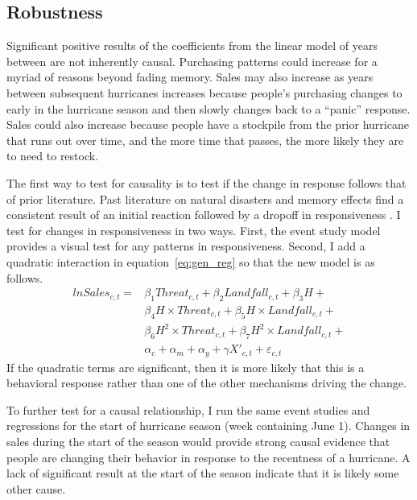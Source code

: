 \documentclass{article}
\begin{document}
\subsection{Robustness}

Significant positive results of the coefficients from the linear model of years between are not inherently causal. Purchasing patterns could increase for a myriad of reasons beyond fading memory. Sales may also increase as years between subsequent hurricanes increases because people's purchasing changes to early in the hurricane season and then slowly changes back to a ``panic'' response. Sales could also increase because people have a stockpile from the prior hurricane that runs out over time, and the more time that passes, the more likely they are to need to restock. 

The first way to test for causality is to test if the change in response follows that of prior literature. Past literature on natural disasters and memory effects find a consistent result of an initial reaction followed by a dropoff in responsiveness \citep{gallagher2014learning,kelly2012evolution,MeyerEtAl14}. I test for changes in responsiveness in two ways. First, the event study model provides a visual test for any patterns in responsiveness. Second, I add a quadratic interaction in equation~\ref{eq:gen_reg} so that the new model is as follows.  
\begin{equation}
\begin{split}
lnSales_{c,t} = &\beta_1 Threat_{c,t} + \beta_2 Landfall_{c,t} + \beta_3 H + \\
&\beta_4 H\times Threat_{c,t} + \beta_5 H\times Landfall_{c,t}+\\
& \beta_6 H^2\times Threat_{c,t} + \beta_7 H^2\times Landfall_{c,t}+\\
 &\alpha_c + \alpha_m + \alpha_y + \gamma X'_{c,t} + \varepsilon_{c,t}
\end{split}
\label{eq:square}
\end{equation}
If the quadratic terms are significant, then it is more likely that this is a behavioral response rather than one of the other mechanisms driving the change. 

To further test for a causal relationship, I run the same event studies and regressions for the start of hurricane season (week containing June 1). Changes in sales during the start of the season would provide strong causal evidence that people are changing their behavior in response to the recentness of a hurricane. A lack of significant result at the start of the season indicate that it is likely some other cause.
\end{document}
